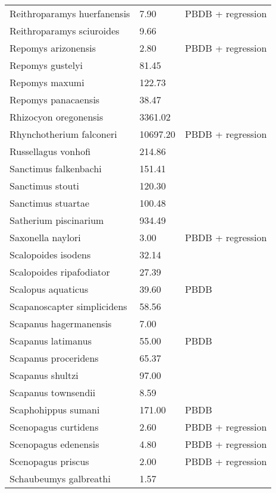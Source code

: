 \documentclass{article}
\begin{document}
\begin{center}
\begin{longtable}{p{} p{} p{}}
    Reithroparamys huerfanensis & 7.90 & PBDB + regression \\ 
    Reithroparamys sciuroides & 9.66 & \cite{Wang1994a} \\ 
    Repomys arizonensis & 2.80 & PBDB + regression \\ 
    Repomys gustelyi & 81.45 & \cite{Tomiya2013} \\ 
    Repomys maxumi & 122.73 & \cite{Tomiya2013} \\ 
    Repomys panacaensis & 38.47 & \cite{Tomiya2013} \\ 
    Rhizocyon oregonensis & 3361.02 & \cite{Tomiya2013} \\ 
    Rhynchotherium falconeri & 10697.20 & PBDB + regression \\ 
    Russellagus vonhofi & 214.86 & \cite{Tomiya2013} \\ 
    Sanctimus falkenbachi & 151.41 & \cite{Tomiya2013} \\ 
    Sanctimus stouti & 120.30 & \cite{Tomiya2013} \\ 
    Sanctimus stuartae & 100.48 & \cite{Tomiya2013} \\ 
    Satherium piscinarium & 934.49 & \cite{Tomiya2013} \\ 
    Saxonella naylori & 3.00 & PBDB + regression \\ 
    Scalopoides isodens & 32.14 & \cite{Tomiya2013} \\ 
    Scalopoides ripafodiator & 27.39 & \cite{Tomiya2013} \\ 
    Scalopus aquaticus & 39.60 & PBDB \\ 
    Scapanoscapter simplicidens & 58.56 & \cite{Tomiya2013} \\ 
    Scapanus hagermanensis & 7.00 & \cite{McKenna2011} \\ 
    Scapanus latimanus & 55.00 & PBDB \\ 
    Scapanus proceridens & 65.37 & \cite{Tomiya2013} \\ 
    Scapanus shultzi & 97.00 & \cite{McKenna2011} \\ 
    Scapanus townsendii & 8.59 & \cite{Smith2004} \\ 
    Scaphohippus sumani & 171.00 & PBDB \\ 
    Scenopagus curtidens & 2.60 & PBDB + regression \\ 
    Scenopagus edenensis & 4.80 & PBDB + regression \\ 
    Scenopagus priscus & 2.00 & PBDB + regression \\ 
    Schaubeumys galbreathi & 1.57 & \cite{Loomis1911} \\ 

\end{longtable}
\end{center}
\end{document}
